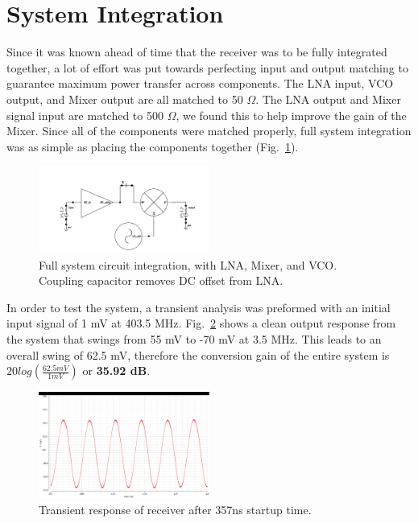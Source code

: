 \section{System Integration}

Since it was known ahead of time that the receiver was to be fully integrated together, a lot of effort was put towards perfecting input and output matching to guarantee maximum power transfer across components. The LNA input, VCO output, and Mixer output are all matched to 50 $\Omega$. The LNA output and Mixer signal input are matched to 500 $\Omega$, we found this to help improve the gain of the Mixer. Since all of the components were matched properly, full system integration was as simple as placing the components together (Fig.~\ref{fig:fullsystem}). 

\begin{figure}[H]
   \centering
    \includegraphics[width=0.5\textwidth]{figures/FullSystem.png}
    \caption{Full system circuit integration, with LNA, Mixer, and VCO. Coupling capacitor removes DC offset from LNA. }
    \label{fig:fullsystem}
\end{figure}

In order to test the system, a transient analysis was preformed with an initial input signal of 1 mV at 403.5 MHz. Fig.~\ref{fig:fullsystemtrans} shows a clean output response from the system that swings from 55 mV to -70 mV at 3.5 MHz. This leads to an overall swing of 62.5 mV, therefore the conversion gain of the entire system is $20log(\frac{62.5 mV}{1 mV})$ or {\bf 35.92 dB}.

\begin{figure}[h]
   \centering
    \includegraphics[width=0.5\textwidth]{figures/FullSystemTrans}
    \caption{Transient response of receiver after 357ns startup time.}
    \label{fig:fullsystemtrans}
\end{figure}

